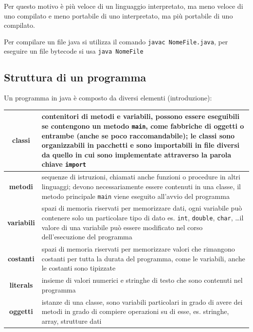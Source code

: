 \documentclass[a4paper]{article}
\begin{document}
Per questo motivo è più veloce di un linguaggio interpretato, ma meno veloce di uno compilato e meno portabile di uno
interpretato, ma più portabile di uno compilato.

Per compilare un file java si utilizza il comando \verb|javac NomeFile.java|, per eseguire un file bytecode si usa
\verb|java NomeFile|


\subsection{Struttura di un programma}
Un programma in java è composto da diversi elementi (introduzione):
\begin{center}
	\begin{tabularx}{\textwidth}{c X}
		\textbf{classi}
		& contenitori di metodi e variabili, possono essere eseguibili se contengono un metodo \verb|main|, come fabbriche
		di oggetti o entrambe (anche se poco raccomandabile); le classi sono organizzabili in pacchetti e sono importabili
		in file diversi da quello in cui sono implementate attraverso la parola chiave \verb|import| \\
		\midrule
		
		\textbf{metodi}
		& sequenze di istruzioni, chiamati anche funzioni o procedure in altri linguaggi; devono necessariamente essere
		contenuti in una classe, il metodo principale \verb|main| viene eseguito all'avvio del programma \\
		\midrule

		\textbf{variabili}
		& spazi di memoria riservati per memorizzare dati, ogni variabile può contenere solo un particolare tipo di dato
		es. \verb|int|, \verb|double|, \verb|char|, \dots il valore di una variabile può essere modificato nel corso
		dell'esecuzione del programma \\
		\midrule
		
		\textbf{costanti}
		& spazi di memoria riservati per memorizzare valori che rimangono costanti per tutta la durata del programma,
		come le variabili, anche le costanti sono tipizzate \\
		\midrule
		
		\textbf{literals}
		& insieme di valori numerici e stringhe di testo che sono contenuti nel programma \\
		\midrule
		
		\textbf{oggetti}
		& istanze di una classe, sono variabili particolari in grado di avere dei metodi in grado di compiere operazioni
		su di esse, es. stringhe, array, strutture dati \\
		\midrule
		

\end{tabularx}
\end{center}
\end{document}

